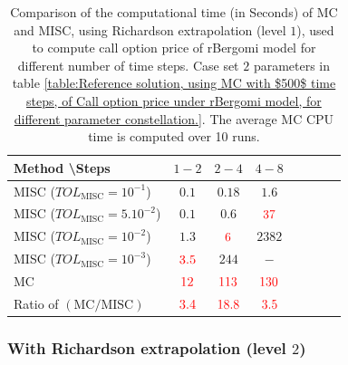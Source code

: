 \begin{table}[h!]
	\centering
	\begin{tabular}{l*{6}{c}r}
		Method \textbackslash  Steps            & $1-2$ & $2-4$ & $4-8$   \\
		\hline
		MISC ($TOL_{\text{MISC}}=10^{-1}$)  & $0.1$ & $0.18$ & $1.6$  \\
		MISC ($TOL_{\text{MISC}}=5.10^{-2}$)  & $0.1$ & $0.6$ & ${\color{red}37}$  \\
		MISC ($TOL_{\text{MISC}}=10^{-2}$)  & $1.3$ & ${\color{red}6}$ & $2382$  \\
		MISC ($TOL_{\text{MISC}}=10^{-3}$)  & ${\color{red}3.5}$ & $ 244$ & $-$   \\
		
		\hline	
		MC  &${\color{red}12}$ & ${\color{red}113}$  & ${\color{red}130}$   \\
		
		\hline	
		Ratio of $\left(\text{MC}/ \text{MISC} \right)$  &${\color{red} 3.4
		}$ & ${\color{red}     18.8
		}$  & ${\color{red} 3.5}
		$  \\
		\hline
		\end{tabular}
		\caption{Comparison of the computational time (in Seconds) of  MC and MISC, using Richardson extrapolation (level $1$), used to compute call option price of rBergomi model for different number of time steps. Case set $2$ parameters in table \ref{table:Reference solution, using MC with $500$ time steps, of Call option price under rBergomi model, for different parameter constellation.}. The
			average MC CPU time is computed over 10 runs.}
		\label{Comparsion of the computational time of  MC and MISC, using Richardson extrapolation (level $1$), used to compute Call option price of rBergomi model for different number of time steps. Case set $2$ parameters,linear}
		\end{table}
		
		\FloatBarrier
	\subsubsection*{With Richardson extrapolation (level $2$)}
		

